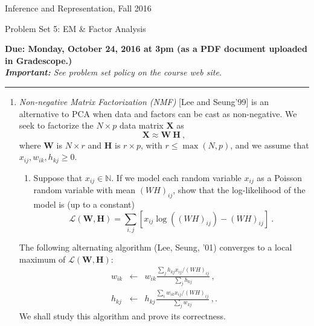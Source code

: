\documentclass{article}
\newcommand{\ruleskip}{\bigskip\hrule\bigskip}
\begin{document}
\pagestyle{myheadings} 

{\LARGE
\begin{center}Inference and Representation, Fall 2016\end{center}
}

{\Large
Problem Set 5: EM \& Factor Analysis
}


{\bf Due: Monday, October 24, 2016 at 3pm (as a PDF document uploaded in
  Gradescope.)}\\

{\em {\bf Important:} See problem set policy on the course web site.}
\ruleskip


\begin{enumerate}

\item \emph{Non-negative Matrix Factorization (NMF)} [Lee and Seung'99] is an alternative to PCA when 
data and factors can be cast as non-negative. We seek to factorize the $N \times p$ data matrix $\mathbf{X}$ as
\begin{equation}
\mathbf{X} \approx \mathbf{ W ~H}~,
\end{equation}
where $\mathbf{W}$ is $N \times r$ and $\mathbf{H}$ is $r \times p$, with $r \leq \max(N,p)$, and 
we assume that $x_{ij}, w_{ik}, h_{kj} \geq 0$.
\begin{enumerate}
\item Suppose that $x_{ij} \in \mathbb{N}$. If we model each random variable $x_{ij}$ as a Poisson 
random variable with mean $(WH)_{ij}$, show that the log-likelihood of the model is (up to a constant) 
\begin{equation}
\label{bla}
\mathcal{L}(\mathbf{W}, \mathbf{H}) = \sum_{i, j} [x_{ij} \log( (WH)_{ij} ) - (WH)_{ij}] ~.
\end{equation}

\end{enumerate}

 The following alternating algorithm (Lee, Seung, '01) converges to a local maximum of $\mathcal{L}(\mathbf{W}, \mathbf{H})$:
\begin{eqnarray}
\label{ble}
w_{ik} &\leftarrow& w_{ik} \frac{\sum_j h_{kj}x_{ij} / ( WH)_{ij}}{\sum_j h_{kj}}~,\\
h_{kj} &\leftarrow& h_{kj} \frac{\sum_i w_{ik}x_{ij} / ( WH)_{ij}}{\sum_j w_{kj}}~,.
\end{eqnarray}
We shall study this algorithm and prove its correctness. 


\end{enumerate}
\end{document}
